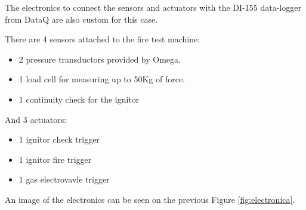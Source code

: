 The electronics to connect the sensors and actuators with the DI-155 data-logger from DataQ are also custom for this case.

There are 4 sensors attached to the fire test machine:
\begin{itemize}
  \item 2 pressure transductors provided by Omega.
  \item 1 load cell for measuring up to 50Kg of force.
  \item 1 continuity check for the ignitor
\end{itemize}

And 3 actuators:
\begin{itemize}
  \item 1 ignitor check trigger
  \item 1 ignitor fire trigger
  \item 1 gas electrovavle trigger
\end{itemize}

An image of the electronics can be seen on the previous Figure \ref{fig:electronica}.
